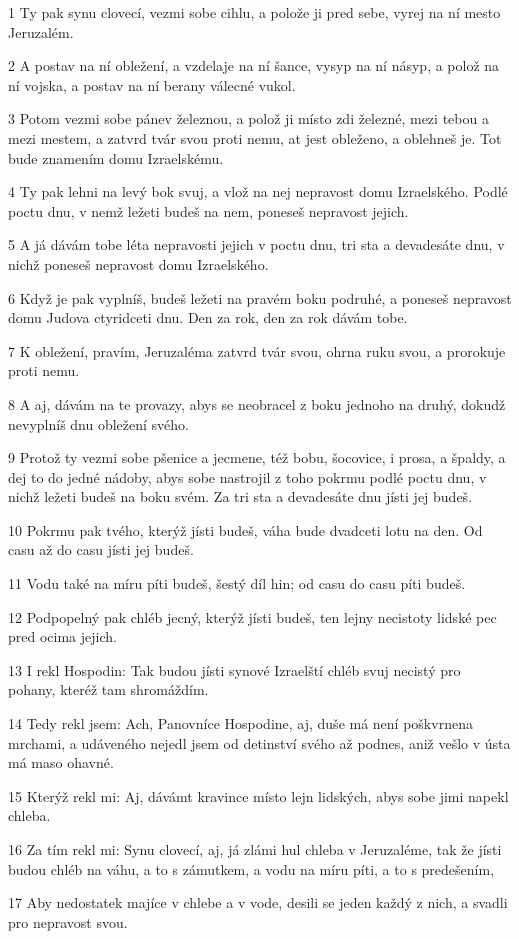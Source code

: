 \par 1 Ty pak synu clovecí, vezmi sobe cihlu, a polože ji pred sebe, vyrej na ní mesto Jeruzalém.
\par 2 A postav na ní obležení, a vzdelaje na ní šance, vysyp na ní násyp, a polož na ní vojska, a postav na ní berany válecné vukol.
\par 3 Potom vezmi sobe pánev železnou, a polož ji místo zdi železné, mezi tebou a mezi mestem, a zatvrd tvár svou proti nemu, at jest obleženo, a oblehneš je. Tot bude znamením domu Izraelskému.
\par 4 Ty pak lehni na levý bok svuj, a vlož na nej nepravost domu Izraelského. Podlé poctu dnu, v nemž ležeti budeš na nem, poneseš nepravost jejich.
\par 5 A já dávám tobe léta nepravosti jejich v poctu dnu, tri sta a devadesáte dnu, v nichž poneseš nepravost domu Izraelského.
\par 6 Když je pak vyplníš, budeš ležeti na pravém boku podruhé, a poneseš nepravost domu Judova ctyridceti dnu. Den za rok, den za rok dávám tobe.
\par 7 K obležení, pravím, Jeruzaléma zatvrd tvár svou, ohrna ruku svou, a prorokuje proti nemu.
\par 8 A aj, dávám na te provazy, abys se neobracel z boku jednoho na druhý, dokudž nevyplníš dnu obležení svého.
\par 9 Protož ty vezmi sobe pšenice a jecmene, též bobu, šocovice, i prosa, a špaldy, a dej to do jedné nádoby, abys sobe nastrojil z toho pokrmu podlé poctu dnu, v nichž ležeti budeš na boku svém. Za tri sta a devadesáte dnu jísti jej budeš.
\par 10 Pokrmu pak tvého, kterýž jísti budeš, váha bude dvadceti lotu na den. Od casu až do casu jísti jej budeš.
\par 11 Vodu také na míru píti budeš, šestý díl hin; od casu do casu píti budeš.
\par 12 Podpopelný pak chléb jecný, kterýž jísti budeš, ten lejny necistoty lidské pec pred ocima jejich.
\par 13 I rekl Hospodin: Tak budou jísti synové Izraelští chléb svuj necistý pro pohany, kteréž tam shromáždím.
\par 14 Tedy rekl jsem: Ach, Panovníce Hospodine, aj, duše má není poškvrnena mrchami, a udáveného nejedl jsem od detinství svého až podnes, aniž vešlo v ústa má maso ohavné.
\par 15 Kterýž rekl mi: Aj, dávámt kravince místo lejn lidských, abys sobe jimi napekl chleba.
\par 16 Za tím rekl mi: Synu clovecí, aj, já zlámi hul chleba v Jeruzaléme, tak že jísti budou chléb na váhu, a to s zámutkem, a vodu na míru píti, a to s predešením,
\par 17 Aby nedostatek majíce v chlebe a v vode, desili se jeden každý z nich, a svadli pro nepravost svou.

